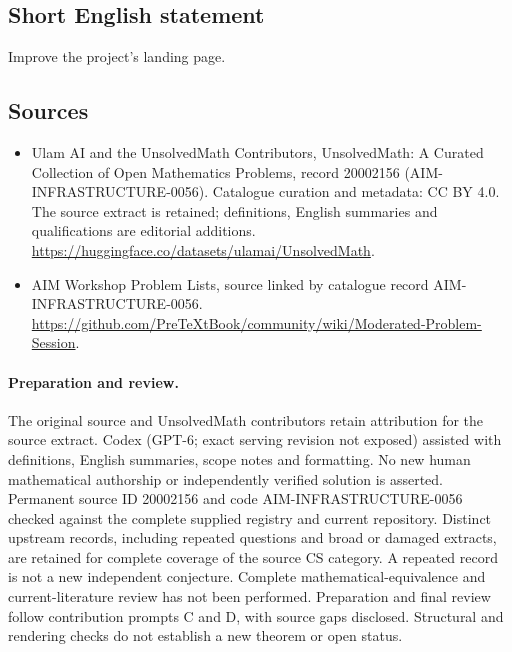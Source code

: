 \documentclass[11pt]{article}
\begin{document}
\subsection{Short English statement}
Improve the project's landing page.
\subsection{Sources}
\begin{itemize}
\item[\hypertarget{source:20002156:1}{S1}] Ulam AI and the UnsolvedMath Contributors, UnsolvedMath: A Curated Collection of Open Mathematics Problems, record 20002156 (AIM-INFRASTRUCTURE-0056). Catalogue curation and metadata: CC BY 4.0. The source extract is retained; definitions, English summaries and qualifications are editorial additions.
\url{https://huggingface.co/datasets/ulamai/UnsolvedMath}.
\item[\hypertarget{source:20002156:2}{S2}] AIM Workshop Problem Lists, source linked by catalogue record AIM-INFRASTRUCTURE-0056.
\url{https://github.com/PreTeXtBook/community/wiki/Moderated-Problem-Session}.
\end{itemize}
\paragraph{Preparation and review.}
The original source and UnsolvedMath contributors retain attribution for the source extract. Codex (GPT-6; exact serving revision not exposed) assisted with definitions, English summaries, scope notes and formatting. No new human mathematical authorship or independently verified solution is asserted. Permanent source ID 20002156 and code AIM-INFRASTRUCTURE-0056 checked against the complete supplied registry and current repository. Distinct upstream records, including repeated questions and broad or damaged extracts, are retained for complete coverage of the source CS category. A repeated record is not a new independent conjecture. Complete mathematical-equivalence and current-literature review has not been performed. Preparation and final review follow contribution prompts C and D, with source gaps disclosed. Structural and rendering checks do not establish a new theorem or open status.
\label{end:20002156}
\end{document}
